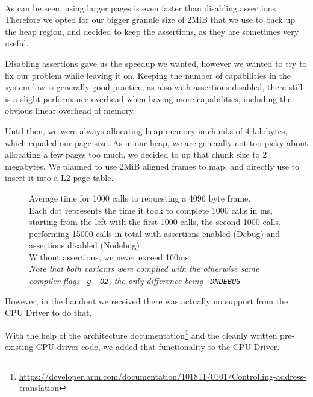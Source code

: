 \paragraph{}
As can be seen, using larger pages is even faster than disabling assertions. Therefore we
opted for our bigger granule size of 2MiB that we use to back up the heap region, and decided
to keep the assertions, as they are sometimes very useful.


Disabling assertions gave us the speedup we wanted, however we wanted to try to fix our
problem while leaving it on. Keeping the number of capabilities in the system low is
generally good practice, as also with assertions disabled, there still is a
slight performance overhead when having more capabilities, including the obvious linear overhead of memory.

Until then, we were always allocating heap memory in chunks of 4 kilobytes, which equaled our
page size. As in our heap, we are generally not too picky about allocating a few pages
too much, we decided to up that chunk size to 2 megabytes. We planned to use
2MiB aligned frames to map, and directly use  to insert it into a
L2 page table. 

    \begin{figure}[hbt!]
        \centering
        \scalebox{0.5}{
            
        }

        \caption{Average time for 1000 calls to  requesting a 4096 byte frame.
        \\
        Each dot represents the time it took to complete 1000 calls in ms, starting
        from the left with the first 1000 calls, the second 1000 calls, performing 15000 calls
        in total with assertions enabled (Debug) and assertions disabled (Nodebug)
        \\
        Without assertions, we never exceed 160ms 
        \\
        \emph{Note that both variants were compiled with the otherwise same compiler flags \texttt{-g -O2}, the only difference being \texttt{-DNDEBUG}}
        }
        \label{fig:paging_with_debug}
    \end{figure}


However, in the handout we received there was actually no support from the CPU Driver
to do that. 

With the help of the architecture documentation\footnote{\url{https://developer.arm.com/documentation/101811/0101/Controlling-address-translation}} and the cleanly written pre-existing CPU driver code, we added that functionality
to the CPU Driver.

